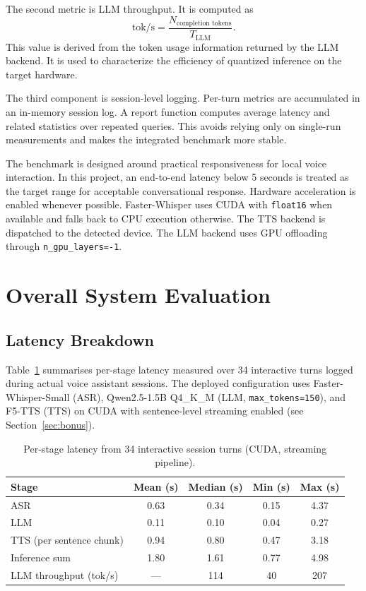 \documentclass[12pt, a4paper]{article}
\begin{document}
The second metric is LLM throughput. It is computed as
\[
\text{tok/s} = \frac{N_{\text{completion tokens}}}{T_{\text{LLM}}}.
\]
This value is derived from the token usage information returned by the LLM backend. It is used to characterize the efficiency of quantized inference on the target hardware.

The third component is session-level logging. Per-turn metrics are accumulated in an in-memory session log. A report function computes average latency and related statistics over repeated queries. This avoids relying only on single-run measurements and makes the integrated benchmark more stable.

The benchmark is designed around practical responsiveness for local voice interaction. In this project, an end-to-end latency below 5 seconds is treated as the target range for acceptable conversational response. Hardware acceleration is enabled whenever possible. Faster-Whisper uses CUDA with \texttt{float16} when available and falls back to CPU execution otherwise. The TTS backend is dispatched to the detected device. The LLM backend uses GPU offloading through \texttt{n\_gpu\_layers=-1}.

\section{Overall System Evaluation}
\label{sec:overall_eval}

\subsection{Latency Breakdown}

Table~\ref{tab:e2e_latency} summarises per-stage latency measured over 34 interactive turns logged during actual voice assistant sessions. The deployed configuration uses Faster-Whisper-Small (ASR), Qwen2.5-1.5B Q4\_K\_M (LLM, \texttt{max\_tokens=150}), and F5-TTS (TTS) on CUDA with sentence-level streaming enabled (see Section~\ref{sec:bonus}).

\begin{table}[H]
\centering
\caption{Per-stage latency from 34 interactive session turns (CUDA, streaming pipeline).}
\label{tab:e2e_latency}
\begin{tabular}{lcccc}
\toprule
Stage & Mean (s) & Median (s) & Min (s) & Max (s) \\
\midrule
ASR                        & 0.63 & 0.34 & 0.15 & 4.37 \\
LLM                        & 0.11 & 0.10 & 0.04 & 0.27 \\
TTS (per sentence chunk)   & 0.94 & 0.80 & 0.47 & 3.18 \\
\midrule
Inference sum              & 1.80 & 1.61 & 0.77 & 4.98 \\
\midrule
LLM throughput (tok/s)     & ---  & 114  & 40   & 207  \\
\bottomrule
\end{tabular}
\end{table}
\end{document}
